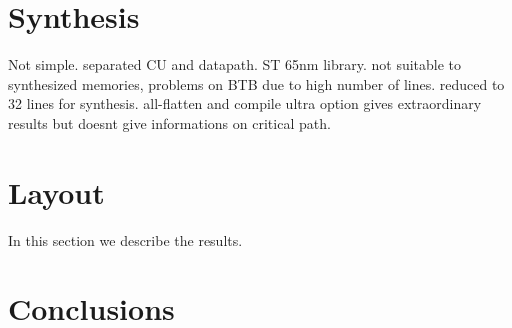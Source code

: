 \documentclass[12pt]{article}
\begin{document}
  

\section{Synthesis}\label{Synthesis}
Not simple. separated CU and datapath.
ST 65nm library. not suitable to synthesized memories, problems on BTB due to high number of lines. reduced to 32 lines for synthesis. 
all-flatten and compile ultra option gives extraordinary results but doesnt give informations on critical path.



\section{Layout}\label{Layout}
In this section we describe the results.

\section{Conclusions}\label{Conclusions}



\end{document}
